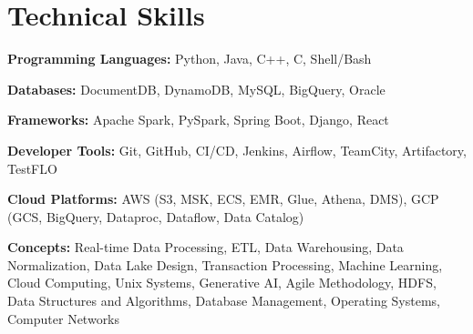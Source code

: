 \documentclass[letterpaper,10pt]{article}
\begin{document}
\section{Technical Skills}
\begin{itemize}[leftmargin=0.15in, label={}, itemsep=-1.5pt]
{
    \item{\textbf{Programming Languages:} Python, Java, C++, C, Shell/Bash}
    \item{\textbf{Databases:} DocumentDB, DynamoDB, MySQL, BigQuery, Oracle}
    \item{\textbf{Frameworks:} Apache Spark, PySpark, Spring Boot, Django, React}
    \item{\textbf{Developer Tools:} Git, GitHub, CI/CD, Jenkins, Airflow, TeamCity, Artifactory, TestFLO}
    \item{\textbf{Cloud Platforms:} AWS (S3, MSK, ECS, EMR, Glue, Athena, DMS), GCP (GCS, BigQuery, Dataproc, Dataflow, Data Catalog)}
    \item{\textbf{Concepts:} Real-time Data Processing, ETL, Data Warehousing, Data Normalization, Data Lake Design, Transaction Processing, Machine Learning, Cloud Computing, Unix Systems, Generative AI, Agile Methodology, HDFS, Data Structures and Algorithms, Database Management, Operating Systems, Computer Networks}
}
\end{itemize}

\end{document}
